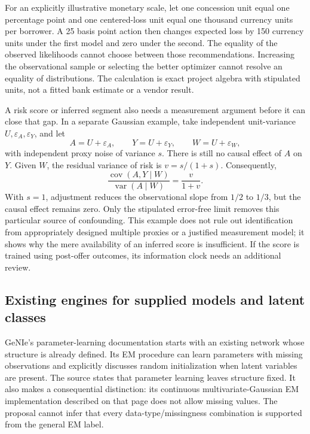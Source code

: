 For an explicitly illustrative monetary scale, let one concession unit
equal one percentage point and one centered-loss unit equal one thousand
currency units per borrower. A 25 basis point action then changes
expected loss by 150 currency units under the first model and zero under
the second. The equality of the observed likelihoods cannot choose
between those recommendations. Increasing the observational sample or
selecting the better optimizer cannot resolve an equality of
distributions. The calculation is exact project algebra with stipulated
units, not a fitted bank estimate or a vendor result.
\citep{exec13_latent_examples}

A risk score or inferred segment also needs a measurement argument
before it can close that gap. In a separate Gaussian example, take
independent unit-variance \(U,\varepsilon_A,\varepsilon_Y\), and let \[
 A=U+\varepsilon_A,\qquad Y=U+\varepsilon_Y,\qquad
 W=U+\varepsilon_W,
\] with independent proxy noise of variance \(s\). There is still no
causal effect of \(A\) on \(Y\). Given \(W\), the residual variance of
risk is \(v=s/(1+s)\). Consequently, \[
 \frac{\operatorname{cov}(A,Y\mid W)}
      {\operatorname{var}(A\mid W)}=
 \frac{v}{1+v}.
\] With \(s=1\), adjustment reduces the observational slope from \(1/2\)
to \(1/3\), but the causal effect remains zero. Only the stipulated
error-free limit removes this particular source of confounding. This
example does not rule out identification from appropriately designed
multiple proxies or a justified measurement model; it shows why the mere
availability of an inferred score is insufficient. If the score is
trained using post-offer outcomes, its information clock needs an
additional review. \citep{exec13_latent_examples}

\hypertarget{existing-engines-for-supplied-models-and-latent-classes}{%
\subsection{Existing engines for supplied models and latent
classes}\label{existing-engines-for-supplied-models-and-latent-classes}}

GeNIe's parameter-learning documentation starts with an existing network
whose structure is already defined. Its EM procedure can learn
parameters with missing observations and explicitly discusses random
initialization when latent variables are present. The source states that
parameter learning leaves structure fixed. It also makes a consequential
distinction: its continuous multivariate-Gaussian EM implementation
described on that page does not allow missing values. The proposal
cannot infer that every data-type/missingness combination is supported
from the general EM label. \citep{exec13_latent_genie_parameters}


